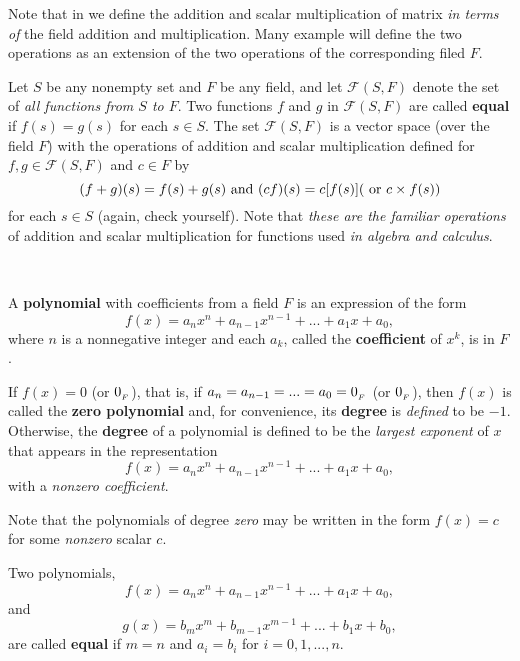\begin{note}
Note that in  we define the addition and scalar multiplication of matrix \emph{in terms of} the field addition and multiplication.
Many example will define the two operations as an extension of the two operations of the corresponding filed \(F\).
\end{note}

\begin{example} \label{example 1.2.3}
Let \(S\) be any nonempty set and \(F\) be any field, and let 
\(\mathcal{F}(S, F)\) denote the set of \emph{all functions from \(S\) to \(F\)}.
Two functions \(f\) and \(g\) in \(\mathcal{F}(S, F)\) are called \textbf{equal} if \(f(s) = g(s)\) for each \(s \in S\).
The set \(\mathcal{F}(S, F)\) is a vector space (over the field \(F\)) with the operations of addition and scalar multiplication defined for \(f, g \in \mathcal{F}(S, F)\) and \(c \in F\) by
\[
    (f + g)(s) = f(s) + g(s) \text{ and  } (cf)(s) = c[f(s)] (\text{ or } c \times f(s))
\]
for each \(s \in S\) (again, check yourself).
Note that \emph{these are the familiar operations} of addition and scalar multiplication for functions used \emph{in algebra and calculus}.
\end{example}

\begin{additional definition} \label{adef 1.4}\ 

 A \textbf{polynomial} with coefficients from a field \(F\) is an expression of the form
\[
    f(x) = a_n x^n + a_{n - 1} x^{n - 1} + ... + a_1 x + a_0,
\]
where \(n\) is a nonnegative integer and each \(a_k\), called the \textbf{coefficient} of \(x^k\), is in \(F\).

 If \(f(x) = 0\) (or \(0_{_F}\)), that is, if \(a_n = a_{n-1} = ... = a_0 = 0_{_F}\) (or \(0_{_F}\)), then \(f(x)\) is called the \textbf{zero polynomial} and, for convenience, its \textbf{degree} is \emph{defined} to be \(-1\). Otherwise, the \textbf{degree} of a polynomial is defined to be the \emph{largest exponent} of \(x\) that appears in the representation
\[
    f(x) = a_n x^n + a_{n - 1} x^{n - 1} + ... + a_1 x + a_0,
\]
with a \emph{nonzero coefficient}.

 Note that the polynomials of degree \emph{zero} may be written in the form \(f(x) = c\) for some \emph{nonzero} scalar \(c\).

 Two polynomials,
\[
    f(x) = a_n x^n + a_{n - 1} x^{n - 1} + ... + a_1 x + a_0,
\]
and
\[
    g(x) = b_m x^m + b_{m - 1} x^{m - 1} + ... + b_1 x + b_0,
\]
are called \textbf{equal} if \(m = n\) and \(a_i = b_i\) for \(i = 0, 1, ..., n\).
\end{additional definition}

